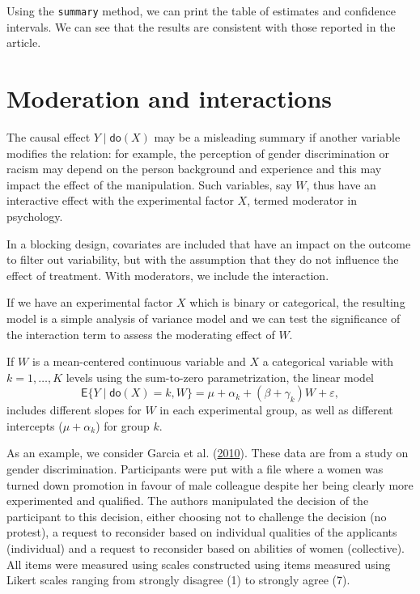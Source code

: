\documentclass[
  11pt,
  letterpaper,
]{scrbook}
\theoremstyle{definition}
\theoremstyle{remark}
\begin{document}
Using the \texttt{summary} method, we can print the table of estimates
and confidence intervals. We can see that the results are consistent
with those reported in the article.

\hypertarget{moderation-and-interactions}{%
\section{Moderation and
interactions}\label{moderation-and-interactions}}

The causal effect \(Y \mid \mathsf{do}(X)\) may be a misleading summary
if another variable modifies the relation: for example, the perception
of gender discrimination or racism may depend on the person background
and experience and this may impact the effect of the manipulation. Such
variables, say \(W\), thus have an interactive effect with the
experimental factor \(X\), termed moderator in psychology.

In a blocking design, covariates are included that have an impact on the
outcome to filter out variability, but with the assumption that they do
not influence the effect of treatment. With moderators, we include the
interaction.

If we have an experimental factor \(X\) which is binary or categorical,
the resulting model is a simple analysis of variance model and we can
test the significance of the interaction term to assess the moderating
effect of \(W\).

If \(W\) is a mean-centered continuous variable and \(X\) a categorical
variable with \(k=1, \ldots, K\) levels using the sum-to-zero
parametrization, the linear model
\[\mathsf{E}\{Y \mid \mathsf{do}(X) = k, W\} = \mu + \alpha_k + (\beta + \gamma_k)W + \varepsilon,\]
includes different slopes for \(W\) in each experimental group, as well
as different intercepts (\(\mu + \alpha_k\)) for group \(k\).

As an example, we consider Garcia et al.
(\protect\hyperlink{ref-Garcia:2010}{2010}). These data are from a study
on gender discrimination. Participants were put with a file where a
women was turned down promotion in favour of male colleague despite her
being clearly more experimented and qualified. The authors manipulated
the decision of the participant to this decision, either choosing not to
challenge the decision (no protest), a request to reconsider based on
individual qualities of the applicants (individual) and a request to
reconsider based on abilities of women (collective). All items were
measured using scales constructed using items measured using Likert
scales ranging from strongly disagree (1) to strongly agree (7).
\end{document}
